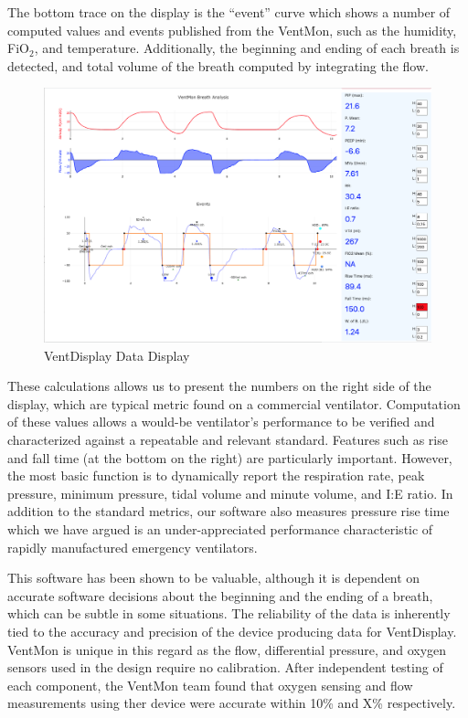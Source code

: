 \documentclass[11pt, letterpaper]{article}
\begin{document}
The bottom trace on the display is the ``event'' curve which shows a number of computed values and events published from the VentMon, such as the humidity, FiO$_2$, and temperature. Additionally, the beginning and ending of each breath is detected, and total volume of the breath computed by integrating the flow.


\begin{figure}[H]
\centering
\includegraphics[width=\textwidth]{VentDisplayExample.png}
\caption{VentDisplay Data Display}
\label{fig:ventdisplay}
\end{figure}

These calculations allows us to present the numbers on the right side of the display, which are typical metric found on a commercial ventilator. Computation of these values allows a would-be ventilator's performance to be verified and characterized against a repeatable and relevant standard. Features such as rise and fall time (at the bottom on the right) are particularly important. However, the most basic function is to dynamically report the respiration rate, peak pressure, minimum pressure, tidal volume and minute volume, and I:E ratio. In addition to the standard metrics, our software also measures pressure rise time which we have argued is an under-appreciated performance characteristic of rapidly manufactured emergency ventilators\cite{schulz2020importance}.

This software has been shown to be valuable, although it is dependent on accurate software decisions about
the beginning and the ending of a breath, which can be subtle in some situations. The reliability of the data is inherently tied to the accuracy and precision of the device producing data for VentDisplay. VentMon is unique in this regard as the flow, differential pressure, and oxygen sensors used in the design require no calibration. After independent testing of each component, the VentMon team found that oxygen sensing and flow measurements using ther device were accurate within 10\% and X\% respectively.		
\end{document}
